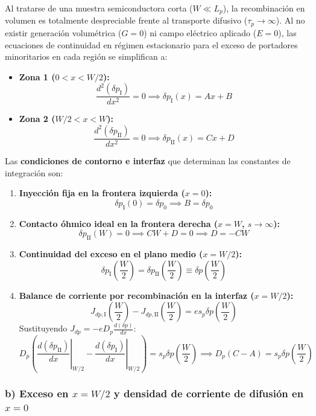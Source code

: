 \begin{problema}
Al tratarse de una muestra semiconductora corta ($W \ll L_p$), la recombinación en volumen es totalmente despreciable frente al transporte difusivo ($\tau_p \to \infty$). Al no existir generación volumétrica ($G = 0$) ni campo eléctrico aplicado ($E = 0$), las ecuaciones de continuidad en régimen estacionario para el exceso de portadores minoritarios en cada región se simplifican a:
\begin{itemize}
    \item \textbf{Zona 1 ($0 < x < W/2$):}
    \[
    \frac{d^2(\delta p_{\text{I}})}{dx^2} = 0 \implies \delta p_{\text{I}}(x) = A x + B
    \]
    \item \textbf{Zona 2 ($W/2 < x < W$):}
    \[
    \frac{d^2(\delta p_{\text{II}})}{dx^2} = 0 \implies \delta p_{\text{II}}(x) = C x + D
    \]
\end{itemize}

Las \textbf{condiciones de contorno e interfaz} que determinan las constantes de integración son:
\begin{enumerate}
    \item \textbf{Inyección fija en la frontera izquierda ($x = 0$):}
    \[
    \delta p_{\text{I}}(0) = \delta p_0 \implies B = \delta p_0
    \]
    \item \textbf{Contacto óhmico ideal en la frontera derecha ($x = W$, $s \to \infty$):}
    \[
    \delta p_{\text{II}}(W) = 0 \implies C W + D = 0 \implies D = -C W
    \]
    \item \textbf{Continuidad del exceso en el plano medio ($x = W/2$):}
    \[
    \delta p_{\text{I}}\left(\frac{W}{2}\right) = \delta p_{\text{II}}\left(\frac{W}{2}\right) \equiv \delta p\left(\frac{W}{2}\right)
    \]
    \item \textbf{Balance de corriente por recombinación en la interfaz ($x = W/2$):}
    \[
    J_{dp,\text{I}}\left(\frac{W}{2}\right) - J_{dp,\text{II}}\left(\frac{W}{2}\right) = e s_p \delta p\left(\frac{W}{2}\right)
    \]
    Sustituyendo $J_{dp} = -e D_p \frac{d(\delta p)}{dx}$:
    \[
    D_p \left( \left.\frac{d(\delta p_{\text{II}})}{dx}\right|_{W/2} - \left.\frac{d(\delta p_{\text{I}})}{dx}\right|_{W/2} \right) = s_p \delta p\left(\frac{W}{2}\right) \implies D_p (C - A) = s_p \delta p\left(\frac{W}{2}\right)
    \]
\end{enumerate}

\subsubsection*{b) Exceso en $x = W/2$ y densidad de corriente de difusión en $x = 0$}


\end{problema}
